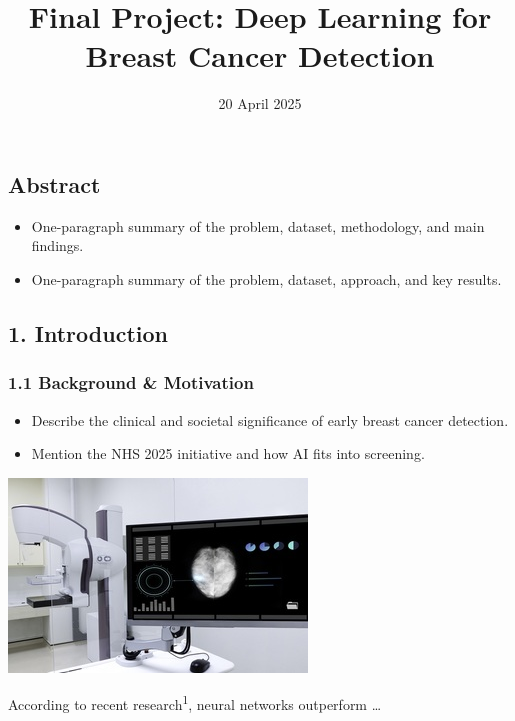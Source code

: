 \documentclass[
  12pt,
  letterpaper,
  DIV=11,
  numbers=noendperiod]{scrartcl}
\title{Final Project: Deep Learning for Breast Cancer Detection}
\author{Takeshi Fujii, MD \and }
\date{20 April 2025}
\providecommand{\tightlist}{%
  \setlength{\itemsep}{0pt}\setlength{\parskip}{0pt}}
\renewcommand*\contentsname{Table of contents}
\newcommand\contentsname{Table of contents}
\begin{document}
\maketitle

\renewcommand*\contentsname{Table of contents}
{
\hypersetup{linkcolor=}
\setcounter{tocdepth}{3}
\tableofcontents
}

\subsection{Abstract}\label{abstract}

\begin{itemize}
\tightlist
\item
  One-paragraph summary of the problem, dataset, methodology, and main
  findings.
\item
  One-paragraph summary of the problem, dataset, approach, and key
  results.
\end{itemize}

\subsection{1. Introduction}\label{introduction}

\subsubsection{1.1 Background \&
Motivation}\label{background-motivation}

\begin{itemize}
\tightlist
\item
  Describe the clinical and societal significance of early breast cancer
  detection.
\item
  Mention the NHS 2025 initiative and how AI fits into screening.
\end{itemize}

\includegraphics[width=0.5\linewidth,height=\textheight,keepaspectratio]{figures/mammogram.jpg}

According to recent research\textsuperscript{1}, neural networks
outperform \ldots{}
\end{document}
